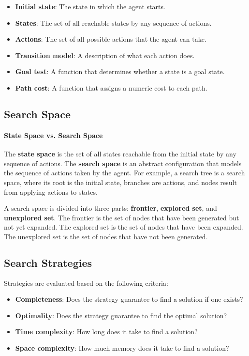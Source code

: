 \documentclass[a4paper,12pt]{article}
\begin{document}
\begin{itemize}
  \item \textbf{Initial state}: The state in which the agent starts.
  \item \textbf{States}: The set of all reachable states by any sequence of actions.
  \item \textbf{Actions}: The set of all possible actions that the agent can take.
  \item \textbf{Transition model}: A description of what each action does.
  \item \textbf{Goal test}: A function that determines whether a state is a goal state.
  \item \textbf{Path cost}: A function that assigns a numeric cost to each path.
\end{itemize}

\subsection{Search Space}

\paragraph{State Space vs. Search Space} The \textbf{state space} is the set of all states reachable from the initial state by any sequence of actions. The \textbf{search space} is an abstract configuration that models the sequence of actions taken by the agent. For example, a search tree is a search space, where its root is the initial state, branches are actions, and nodes result from applying actions to states.

A search space is divided into three parts: \textbf{frontier}, \textbf{explored set}, and \textbf{unexplored set}. The frontier is the set of nodes that have been generated but not yet expanded. The explored set is the set of nodes that have been expanded. The unexplored set is the set of nodes that have not been generated.

\subsection{Search Strategies}

Strategies are evaluated based on the following criteria: 
\begin{itemize}
  \item \textbf{Completeness}: Does the strategy guarantee to find a solution if one exists?
  \item \textbf{Optimality}: Does the strategy guarantee to find the optimal solution?
  \item \textbf{Time complexity}: How long does it take to find a solution?
  \item \textbf{Space complexity}: How much memory does it take to find a solution?
\end{itemize}
\end{document}
